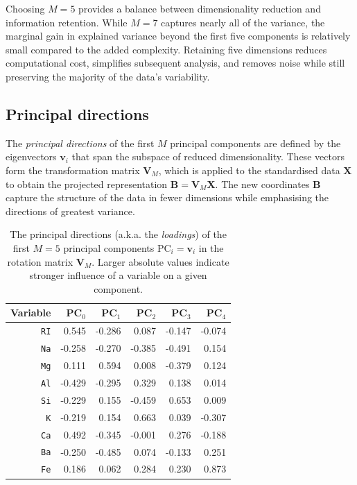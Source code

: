 \documentclass[dtu]{dtuarticle}
\begin{document}
	Choosing $M=5$ provides a balance between dimensionality reduction and information retention. While $M=7$ captures nearly all of the variance, the marginal gain in explained variance beyond the first five components is relatively small compared to the added complexity. Retaining five dimensions reduces computational cost, simplifies subsequent analysis, and removes noise while still preserving the majority of the data's variability.

	\subsection{Principal directions}

	The \textit{principal directions} of the first $M$ principal components are defined by the eigenvectors $\bm{v}_i$ that span the subspace of reduced dimensionality. These vectors form the transformation matrix $\bm{V}_M$, which is applied to the standardised data $\bm{X}$ to obtain the projected representation $\bm{B} = \bm{V}_M \bm{X}$. The new coordinates $\bm{B}$ capture the structure of the data in fewer dimensions while emphasising the directions of greatest variance.

	\begin{table}[h!]
		\centering
		\begin{tabular}{r | *{5}{|r}}
			\textbf{Variable} & $\textbf{PC}_0$ & $\textbf{PC}_1$ & $\textbf{PC}_2$ & $\textbf{PC}_3$ & $\textbf{PC}_4$ \\ \hline\hline
			      \texttt{RI} & \num{0.545}     &          -0.286 &           0.087 &          -0.147 &          -0.074 \\
			      \texttt{Na} & -0.258          &          -0.270 &          -0.385 &          -0.491 &           0.154 \\
			      \texttt{Mg} & 0.111           &           0.594 &           0.008 &          -0.379 &           0.124 \\
			      \texttt{Al} & -0.429          &          -0.295 &           0.329 &           0.138 &           0.014 \\
			      \texttt{Si} & -0.229          &           0.155 &          -0.459 &           0.653 &           0.009 \\
			       \texttt{K} & -0.219          &           0.154 &           0.663 &           0.039 &          -0.307 \\
			      \texttt{Ca} & 0.492           &          -0.345 &          -0.001 &           0.276 &          -0.188 \\
			      \texttt{Ba} & -0.250          &          -0.485 &           0.074 &          -0.133 &           0.251 \\
			      \texttt{Fe} & 0.186           &           0.062 &           0.284 &           0.230 &           0.873
		\end{tabular}
		\caption{The principal directions (a.k.a. the \textit{loadings}) of the first $M=5$ principal components $\text{PC}_i = \bm{v}_i$ in the rotation matrix $\bm{V}_M$. Larger absolute values indicate stronger influence of a variable on a given component.}
		\label{table:loadings}
	\end{table}
\end{document}
